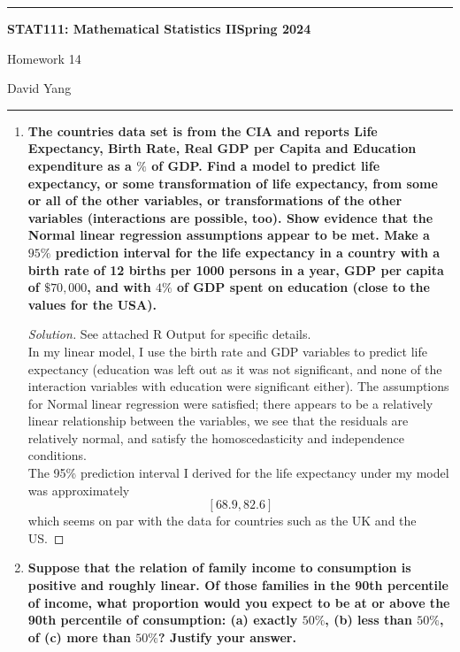 \documentclass[11pt]{article}
\newenvironment{solution}
  {\renewcommand\qedsymbol{$\blacksquare$}\begin{proof}[Solution]}
  {\end{proof}}
\begin{document}
	\hrule
	\begin{center}
        \textbf{STAT111: Mathematical Statistics II}\hfill \textbf{Spring 2024}\newline

		{\Large Homework 14}

		David Yang
	\end{center}

\hrule

\vspace{1em}

\begin{enumerate}
    \item \textbf{The countries data set is from the CIA and reports Life Expectancy, Birth Rate, Real GDP per
    Capita and Education expenditure as a $\%$ of GDP. Find a model to predict life expectancy, or some
    transformation of life expectancy, from some or all of the other variables, or transformations of the
    other variables (interactions are possible, too). Show evidence that the Normal linear regression
    assumptions appear to be met. Make a $95\%$ prediction interval for the life expectancy in a country
    with a birth rate of 12 births per 1000 persons in a year, GDP per capita of $\$70,000$, and with $4\%$
    of GDP spent on education (close to the values for the USA).}

    \begin{solution}
    See attached R Output for specific details. \\

    In my linear model, I use the birth rate and GDP variables to predict life expectancy (education was left out as it was not significant, and 
    none of the interaction variables with education were significant either). The assumptions for Normal linear regression were satisfied;
    there appears to be a relatively linear relationship between the variables, we see that the residuals are relatively normal, and 
    satisfy the homoscedasticity and independence conditions. \\

    The 95\% prediction interval I derived for the life expectancy under my model was approximately
    \[
      \boxed{[68.9, 82.6]}
    \]
    which seems on par with the data for countries such as the UK and the US.
    \end{solution}

    \item \textbf{Suppose that the relation of family income to consumption is positive and roughly linear. Of those
    families in the 90th percentile of income, what proportion would you expect to be at or above the
    90th percentile of consumption: (a) exactly $50\%$, (b) less than $50\%$, of (c) more than $50\%$? Justify
    your answer.}


\end{enumerate}
\end{document}

